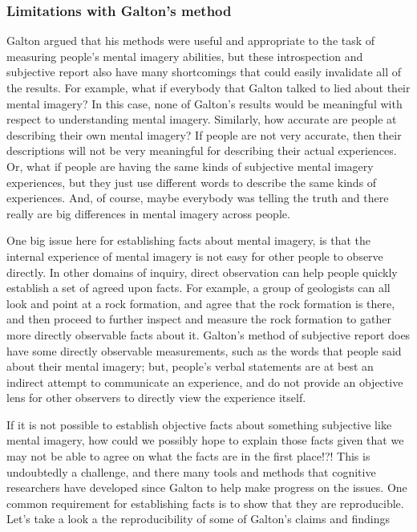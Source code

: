 \documentclass[
  oneside,
  12pt]{crumpbook}
\begin{document}
\hypertarget{limitations-with-galtons-method}{%
\subsubsection{Limitations with Galton's method}\label{limitations-with-galtons-method}}

Galton argued that his methods were useful and appropriate to the task of measuring people's mental imagery abilities, but these introspection and subjective report also have many shortcomings that could easily invalidate all of the results. For example, what if everybody that Galton talked to lied about their mental imagery? In this case, none of Galton's results would be meaningful with respect to understanding mental imagery. Similarly, how accurate are people at describing their own mental imagery? If people are not very accurate, then their descriptions will not be very meaningful for describing their actual experiences. Or, what if people are having the same kinds of subjective mental imagery experiences, but they just use different words to describe the same kinds of experiences. And, of course, maybe everybody was telling the truth and there really are big differences in mental imagery across people.

One big issue here for establishing facts about mental imagery, is that the internal experience of mental imagery is not easy for other people to observe directly. In other domains of inquiry, direct observation can help people quickly establish a set of agreed upon facts. For example, a group of geologists can all look and point at a rock formation, and agree that the rock formation is there, and then proceed to further inspect and measure the rock formation to gather more directly observable facts about it. Galton's method of subjective report does have some directly observable measurements, such as the words that people said about their mental imagery; but, people's verbal statements are at best an indirect attempt to communicate an experience, and do not provide an objective lens for other observers to directly view the experience itself.

If it is not possible to establish objective facts about something subjective like mental imagery, how could we possibly hope to explain those facts given that we may not be able to agree on what the facts are in the first place!?! This is undoubtedly a challenge, and there many tools and methods that cognitive researchers have developed since Galton to help make progress on the issues. One common requirement for establishing facts is to show that they are reproducible. Let's take a look a the reproducibility of some of Galton's claims and findings
\end{document}

